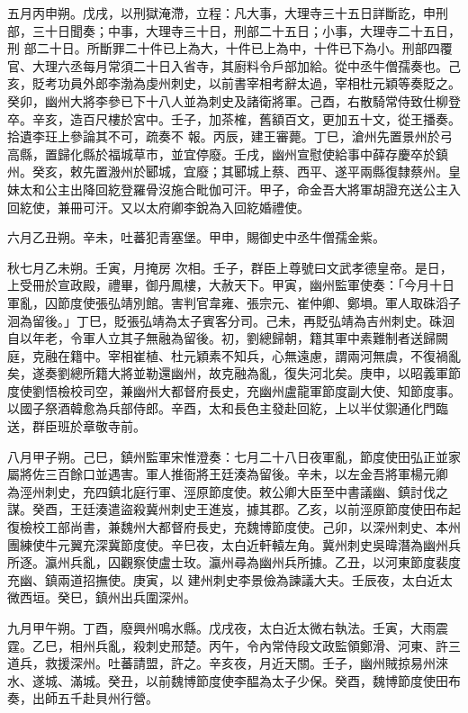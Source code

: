 \begin{pinyinscope}
 五月丙申朔。戊戌，以刑獄淹滯，立程：凡大事，大理寺三十五日詳斷訖，申刑部，三十日聞奏；中事，大理寺三十日，刑部二十五日；小事，大理寺二十五日，刑
 部二十日。所斷罪二十件已上為大，十件已上為中，十件已下為小。刑部四覆官、大理六丞每月常須二十日入省寺，其廚料令戶部加給。從中丞牛僧孺奏也。己亥，貶考功員外郎李渤為虔州刺史，以前書宰相考辭太過，宰相杜元穎等奏貶之。癸卯，幽州大將李參已下十八人並為刺史及諸衛將軍。己酉，右散騎常侍致仕柳登卒。辛亥，造百尺樓於宮中。壬子，加茶榷，舊額百文，更加五十文，從王播奏。拾遺李玨上參論其不可，疏奏不
 報。丙辰，建王審薨。丁巳，滄州先置景州於弓高縣，置歸化縣於福城草市，並宜停廢。壬戌，幽州宣慰使給事中薛存慶卒於鎮州。癸亥，敕先置溵州於郾城，宜廢；其郾城上蔡、西平、遂平兩縣復隸蔡州。皇妹太和公主出降回紇登羅骨沒施合毗伽可汗。甲子，命金吾大將軍胡證充送公主入回紇使，兼冊可汗。又以太府卿李銳為入回紇婚禮使。



 六月乙丑朔。辛未，吐蕃犯青塞堡。甲申，賜御史中丞牛僧孺金紫。



 秋七月乙未朔。壬寅，月掩房
 次相。壬子，群臣上尊號曰文武孝德皇帝。是日，上受冊於宣政殿，禮畢，御丹鳳樓，大赦天下。甲寅，幽州監軍使奏：「今月十日軍亂，囚節度使張弘靖別館。害判官韋雍、張宗元、崔仲卿、鄭塤。軍人取硃滔子洄為留後。」丁巳，貶張弘靖為太子賓客分司。己未，再貶弘靖為吉州刺史。硃洄自以年老，令軍人立其子無融為留後。初，劉總歸朝，籍其軍中素難制者送歸闕庭，克融在籍中。宰相崔植、杜元穎素不知兵，心無遠慮，謂兩河無虞，不復禍亂
 矣，遂奏劉總所籍大將並勒還幽州，故克融為亂，復失河北矣。庚申，以昭義軍節度使劉悟檢校司空，兼幽州大都督府長史，充幽州盧龍軍節度副大使、知節度事。以國子祭酒韓愈為兵部侍郎。辛酉，太和長色主發赴回紇，上以半仗禦通化門臨送，群臣班於章敬寺前。



 八月甲子朔。己巳，鎮州監軍宋惟澄奏：七月二十八日夜軍亂，節度使田弘正並家屬將佐三百餘口並遇害。軍人推衙將王廷湊為留後。辛未，以左金吾將軍楊元卿
 為涇州刺史，充四鎮北庭行軍、涇原節度使。敕公卿大臣至中書議幽、鎮討伐之謀。癸酉，王廷湊遣盜殺冀州刺史王進岌，據其郡。乙亥，以前涇原節度使田布起復檢校工部尚書，兼魏州大都督府長史，充魏博節度使。己卯，以深州刺史、本州團練使牛元翼充深冀節度使。辛巳夜，太白近軒轅左角。冀州刺史吳暐潛為幽州兵所逐。瀛州兵亂，囚觀察使盧士玫。瀛州尋為幽州兵所據。乙丑，以河東節度裴度充幽、鎮兩道招撫使。庚寅，以
 建州刺史李景儉為諫議大夫。壬辰夜，太白近太微西垣。癸巳，鎮州出兵圍深州。



 九月甲午朔。丁酉，廢興州鳴水縣。戊戌夜，太白近太微右執法。壬寅，大雨震霆。乙巳，相州兵亂，殺刺史邢楚。丙午，令內常侍段文政監領鄭滑、河東、許三道兵，救援深州。吐蕃請盟，許之。辛亥夜，月近天關。壬子，幽州賊掠易州淶水、遂城、滿城。癸丑，以前魏博節度使李醖為太子少保。癸酉，魏博節度使田布奏，出師五千赴貝州行營。




\end{pinyinscope}
